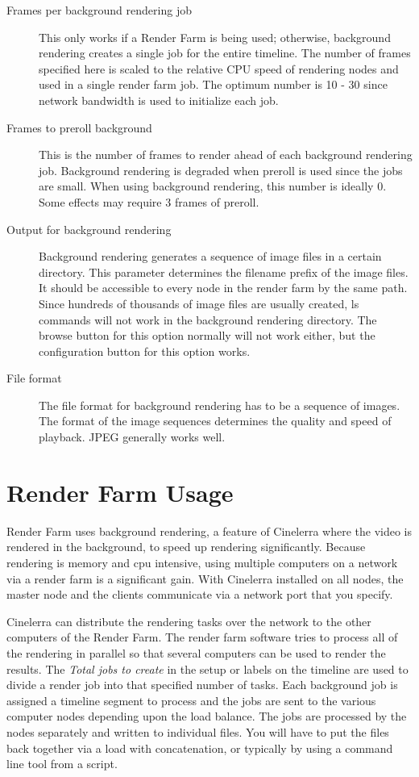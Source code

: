 \begin{description}
    \item[Frames per background rendering job] This only works if a Render Farm is being used; otherwise, background rendering creates a single job for the entire timeline. The number of frames specified here is scaled to the relative CPU speed of rendering nodes and used in a single render farm job. The optimum number is 10 - 30 since network bandwidth is used to initialize each job.
    \item[Frames to preroll background] This is the number of frames to render ahead of each background rendering job. Background rendering is degraded when preroll is used since the jobs are small. When using background rendering, this number is ideally 0. Some effects may require 3 frames of preroll.
    \item[Output for background rendering] Background rendering generates a sequence of image files in a certain directory. This parameter determines the filename prefix of the image files. It should be accessible to every node in the render farm by the same path. Since hundreds of thousands of image files are usually created, ls commands will not work in the background rendering directory. The browse button for this option normally will not work either, but the configuration button for this option works.
    \item[File format] The file format for background rendering has to be a sequence of images. The format of the image sequences determines the quality and speed of playback. JPEG generally works well.
\end{description}

\section{Render Farm Usage}%
\label{sec:render_farm_usage}

Render Farm uses background rendering, a feature of Cinelerra where the video is rendered in the background, to speed up rendering significantly.  Because rendering is memory and cpu intensive, using multiple computers on a network via a render farm is a significant gain.  With Cinelerra installed on all nodes, the master node and the clients communicate via a network port that you specify. 

Cinelerra can distribute the rendering tasks over the network to the other computers of the Render Farm.  The render farm software tries to process all of the rendering in parallel so that several computers can be used to render the results.  The \textit{Total jobs to create} in the setup or labels on the timeline are used to divide a render job into that specified number of tasks.  Each background job is assigned a timeline segment to process and the jobs are sent to the various computer nodes depending upon the load balance.  The jobs are processed by the nodes separately and written to individual files.  You will have to put the files back together via a load with concatenation, or typically by using a command line tool from a script.

